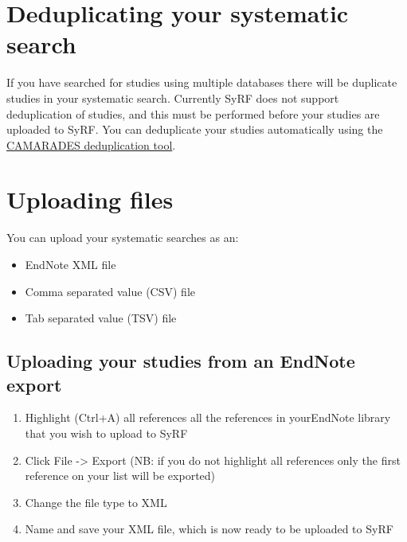 \documentclass[
]{book}
\providecommand{\tightlist}{%
  \setlength{\itemsep}{0pt}\setlength{\parskip}{0pt}}
\begin{document}
\hypertarget{deduplicating-your-systematic-search}{%
\section{Deduplicating your systematic search}\label{deduplicating-your-systematic-search}}

If you have searched for studies using multiple databases there will be duplicate studies in your systematic search. Currently SyRF does not support deduplication of studies, and this must be performed before your studies are uploaded to SyRF. You can deduplicate your studies automatically using the \href{https://camarades.shinyapps.io/RDedup/}{CAMARADES deduplication tool}.

\hypertarget{uploading-files}{%
\section{Uploading files}\label{uploading-files}}

You can upload your systematic searches as an:

\begin{itemize}
\tightlist
\item
  EndNote XML file
\item
  Comma separated value (CSV) file
\item
  Tab separated value (TSV) file
\end{itemize}

\hypertarget{uploading-your-studies-from-an-endnote-export}{%
\subsection{Uploading your studies from an EndNote export}\label{uploading-your-studies-from-an-endnote-export}}

\begin{enumerate}
\def\labelenumi{\arabic{enumi}.}
\tightlist
\item
  Highlight (Ctrl+A) all references all the references in yourEndNote library that you wish to upload to SyRF
\item
  Click File -\textgreater{} Export (NB: if you do not highlight all references only the first reference on your list will be exported)
\item
  Change the file type to XML
\item
  Name and save your XML file, which is now ready to be uploaded to SyRF
\end{enumerate}
\end{document}
